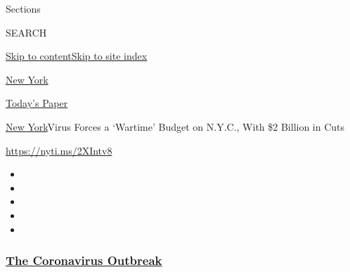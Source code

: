 Sections

SEARCH

\protect\hyperlink{site-content}{Skip to
content}\protect\hyperlink{site-index}{Skip to site index}

\href{https://www.nytimes3xbfgragh.onion/section/nyregion}{New York}

\href{https://myaccount.nytimes3xbfgragh.onion/auth/login?response_type=cookie\&client_id=vi}{}

\href{https://www.nytimes3xbfgragh.onion/section/todayspaper}{Today's
Paper}

\href{/section/nyregion}{New York}\textbar{}Virus Forces a `Wartime'
Budget on N.Y.C., With \$2 Billion in Cuts

\url{https://nyti.ms/2XIntv8}

\begin{itemize}
\item
\item
\item
\item
\item
\end{itemize}

\hypertarget{the-coronavirus-outbreak}{%
\subsubsection{\texorpdfstring{\href{https://www.nytimes3xbfgragh.onion/news-event/coronavirus?name=styln-coronavirus-national\&region=TOP_BANNER\&block=storyline_menu_recirc\&action=click\&pgtype=Article\&impression_id=8b286470-f27f-11ea-8789-45ae9f4c38e2\&variant=undefined}{The
Coronavirus
Outbreak}}{The Coronavirus Outbreak}}\label{the-coronavirus-outbreak}}

